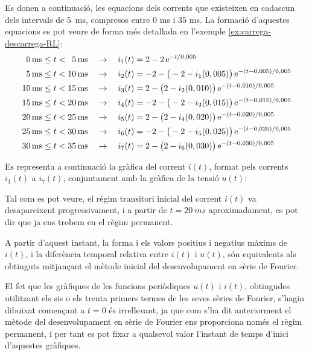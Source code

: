 \begin{exemple}
    Es donen a continuació, les equacions dels corrents que existeixen en cadascun dels intervals de \SI{5}{ms}, compresos entre 0 ms i 35 ms. La formació d'aquestes equacions es pot veure de forma més detallada en l'exemple \vref{ex:carrega-descarrega-RL}:
    \begin{align*}
      \phantom{0}\SI{0}{ms} \leq t < \phantom{0}\SI{5}{ms}  & \quad\rightarrow\quad i_1(t) = 2 - 2 \,\mathrm{e}^{-t/0,005} \\
      \phantom{0}\SI{5}{ms} \leq t < \SI{10}{ms} & \quad\rightarrow\quad i_2(t) = -2 - \big(-2 - i_1(0,005)\big)\, \mathrm{e}^{-(t-0,005)/0,005}  \\
      \SI{10}{ms}\leq t < \SI{15}{ms} & \quad\rightarrow\quad i_3(t) = 2 - \big(2 - i_2(0,010)\big)\, \mathrm{e}^{-(t-0,010)/0,005} \\
      \SI{15}{ms} \leq t < \SI{20}{ms} & \quad\rightarrow\quad i_4(t) = -2 - \big(-2 - i_3(0,015)\big)\, \mathrm{e}^{-(t-0,015)/0,005}  \\
      \SI{20}{ms}\leq t < \SI{25}{ms} & \quad\rightarrow\quad i_5(t) = 2 - \big(2 - i_4(0,020)\big)\, \mathrm{e}^{-(t-0,020)/0,005} \\
      \SI{25}{ms} \leq t < \SI{30}{ms} & \quad\rightarrow\quad i_6(t) = -2 - \big(-2 - i_5(0,025)\big)\, \mathrm{e}^{-(t-0,025)/0,005}  \\
      \SI{30}{ms}\leq t < \SI{35}{ms} & \quad\rightarrow\quad i_7(t) = 2 - \big(2 - i_6(0,030)\big)\, \mathrm{e}^{-(t-0,030)/0,005}
    \end{align*}

    Es representa a continuació la gràfica del corrent $i(t)$, format pels corrents $i_1(t)$ a $i_7(t)$, conjuntament amb la gràfica de la tensió $u(t)$:
    \begin{center}
      
    \end{center}

    Tal com es pot veure, el règim transitori inicial del corrent $i(t)$ va desapareixent progressivament, i a partir de $t=\SI{20}{ms}$ aproximadament, es pot dir que ja ens trobem en el règim permanent.

    A partir d'aquest instant, la forma i els valors positius i negatius màxims de $i(t)$, i la diferència temporal relativa entre $i(t)$ i $u(t)$, són equivalents als obtinguts mitjançant el mètode inicial del desenvolupament en sèrie de Fourier.

    El fet que les gràfiques de les funcions periòdiques $u(t)$ i  $i(t)$, obtingudes utilitzant els sis o els trenta primers termes de les seves sèries de Fourier, s'hagin dibuixat començant a $t=0$ és irrellevant, ja que com s'ha dit anteriorment  el mètode del desenvolupament en sèrie de Fourier ens proporciona només el règim permanent, i per tant es pot fixar a qualsevol valor l'instant de temps d'inici d'aquestes gràfiques.
\end{exemple}
